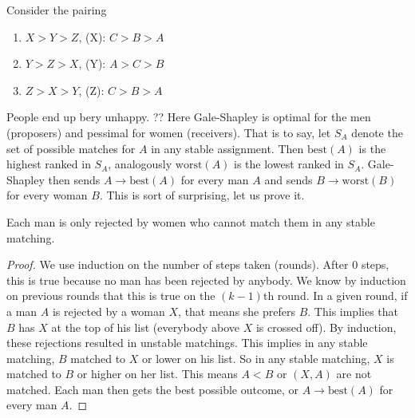\begin{example}
    Consider the pairing
\begin{enumerate}[label=(\Alph*)]
\setlength\itemsep{-.2em}
    \item $X>Y>Z$, (X): $C>B>A$
    \item $Y>Z>X $, (Y): $A>C>B$
    \item $Z>X>Y$, (Z): $C>B>A$
\end{enumerate}
People end up bery unhappy. ?? Here Gale-Shapley is optimal for the men (proposers) and pessimal for women (receivers). That is to say, let  $S_A$ denote the set of possible matches for $A$ in any stable assignment. Then $\mathrm{best}(A)$ is the highest ranked in $S_A$, analogously $\mathrm{worst}(A)$ is the lowest ranked in $S_A$. Gale-Shapley then sends $A \to \mathrm{best}(A)$ for every man $A$ and sends $B\to \mathrm{worst}(B)$ for every woman $B$. This is sort of surprising, let us prove it.
\end{example}
\begin{lemma}
    Each man is only rejected by women who cannot match them in any stable matching.
\end{lemma}
\begin{proof}
    We use induction on the number of steps taken (rounds). After 0 steps, this is true because no man has been rejected by anybody. We know by induction on previous rounds that this is true on the $(k-1)$th round. In a given round, if a man $A$ is rejected by a woman $X$, that means she prefers $B$. This implies that $B$ has $X$ at the top of his list (everybody above $X$ is crossed off). By induction, these rejections resulted in unstable matchings. This implies in any stable matching, $B$ matched to $X$ or lower on his list. So in any stable matching, $X$ is matched to $B$ or higher on her list. This means $A<B$ or $(X,A)$ are not matched. Each man then gets the best possible outcome, or $A \to \mathrm{best}(A)$ for every man $A$.
\end{proof}

